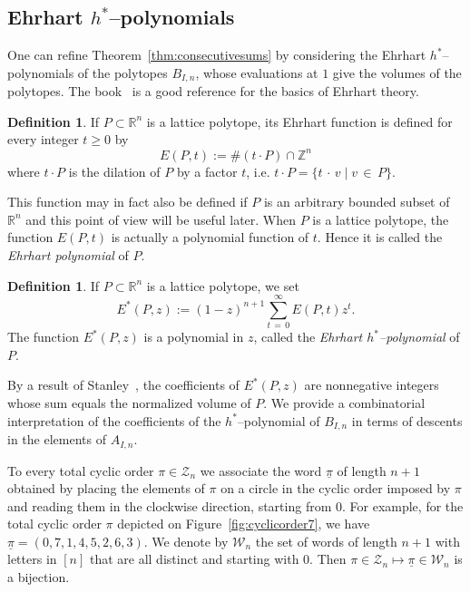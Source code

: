 \documentclass[11pt]{article}
\theoremstyle{definition}
\newtheorem{defi}[theo]{Definition}
\numberwithin{equation}{section}
\numberwithin{figure}{section}
\numberwithin{table}{section}
\newcommand{\calZ}{\mathcal Z}
\newcommand{\calW}{\mathcal W}
\newcommand{\Z}{\mathbb Z}
\begin{document}
\subsection{\texorpdfstring{Ehrhart $h^*$--polynomials}{Ehrhart h*-polynomials}}

One can refine Theorem~\ref{thm:consecutivesums} by considering the Ehrhart $h^*$--polynomials of the polytopes $B_{I,n}$, whose evaluations at $1$ give the volumes of the polytopes. The book~\cite{BR15} is a good reference for the basics of Ehrhart theory.

\begin{defi}
If $P\subset \mathbb{R}^n$ is a lattice polytope, its Ehrhart function is defined for every integer $t\geq 0$ by
\[
E(P, t) := \# (t\cdot P) \cap \Z^n
\]
where $t\cdot P$ is the dilation of $P$ by a factor $t$, i.e. $t\cdot P = \{t\,\cdot\,v\;|\;v\,\in\,P\}$.
\end{defi}

This function may in fact also be defined if $P$ is an arbitrary bounded subset of $\mathbb{R}^n$ and this point of view will be useful later. When $P$ is a lattice polytope, the function $E(P,t)$ is actually a polynomial function of $t$. Hence it is called the \emph{Ehrhart polynomial} of $P$.

\begin{defi}
If $P\subset \mathbb{R}^n$ is a lattice polytope, we set
\[
E^*(P,z) := (1-z)^{n+1} \sum_{t\,=\,0}^\infty E(P,t) z^t.
\]
The function $E^*(P,z)$ is a polynomial in $z$, called the \emph{Ehrhart $h^*$--polynomial} of $P$.
\end{defi}

By a result of Stanley~\cite{S80}, the coefficients of $E^*(P,z)$ are nonnegative integers whose sum equals the normalized volume of $P$. We provide a combinatorial interpretation of the coefficients of the $h^*$--polynomial of $B_{I,n}$ in terms of descents in the elements of $A_{I,n}$.

To every total cyclic order $\pi\in\calZ_n$ we associate the word $\underline{\pi}$ of length $n+1$ obtained by placing the elements of $\pi$ on a circle in the cyclic order imposed by $\pi$ and reading them in the clockwise direction, starting from $0$. For example, for the total cyclic order $\pi$ depicted on Figure~\ref{fig:cyclicorder7}, we have $\underline{\pi}=(0,7,1,4,5,2,6,3)$. We denote by $\calW_n$ the set of words of length $n+1$ with letters in $[n]$ that are all distinct and starting with $0$. Then $\pi \in\calZ_n \mapsto \underline{\pi} \in\calW_n$ is a bijection.
\end{document}
